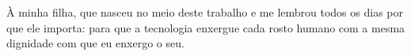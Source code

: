 À minha filha, que nasceu no meio deste trabalho e me lembrou todos os dias por que ele importa: para que a tecnologia enxergue cada rosto humano com a mesma dignidade com que eu enxergo o seu.
